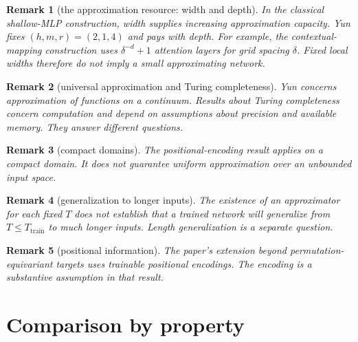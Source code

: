 \documentclass[11pt]{article}
\newtheorem*{remark}{Remark}
\begin{document}
\begin{remark}[the approximation resource: width and depth]
In the classical shallow-MLP construction, width supplies increasing
approximation capacity. Yun fixes $(h,m,r)=(2,1,4)$ and pays with depth.
For example, the contextual-mapping construction uses
$\delta^{-d}+1$ attention layers for grid spacing $\delta$.
Fixed local widths therefore do not imply a small approximating network.
\end{remark}

\begin{remark}[universal approximation and Turing completeness]
Yun concerns approximation of functions on a continuum. Results about
Turing completeness concern computation and depend on assumptions
about precision and available memory. They answer different questions.
\end{remark}

\begin{remark}[compact domains]
The positional-encoding result applies on a compact domain.
It does not guarantee uniform approximation over an unbounded input space.
\end{remark}

\begin{remark}[generalization to longer inputs]
The existence of an approximator for each fixed $T$ does not establish
that a trained network will generalize from $T\le T_{\text{train}}$
to much longer inputs. Length generalization is a separate question.
\end{remark}

\begin{remark}[positional information]
The paper's extension beyond permutation-equivariant targets uses
trainable positional encodings. The encoding is a substantive assumption
in that result.
\end{remark}

\section{Comparison by property}
\end{document}
